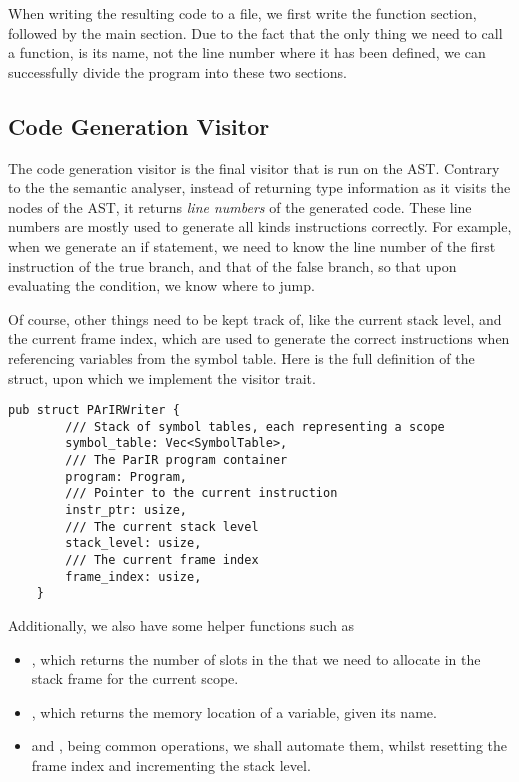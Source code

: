 When writing the resulting  code to a file, we first write the
function section, followed by the main section. Due to the fact that the only
thing we need to call a function, is its name, not the line number where it has
been defined, we can successfully divide the program into these two sections.

\newpage

\subsection{Code Generation Visitor}

The code generation visitor is the final visitor that is run on the AST.
Contrary to the the semantic analyser, instead of returning type information as
it visits the nodes of the AST, it returns \textit{line numbers} of the
generated  code. These line numbers are mostly used to generate all
kinds  instructions correctly. For example, when we generate an if
statement, we need to know the line number of the first instruction of the true
branch, and that of the false branch, so that upon evaluating the condition, we
know where to jump.

Of course, other things need to be kept track of, like the current stack level,
and the current frame index, which are used to generate the correct 
instructions when referencing variables from the symbol table. Here is the full
definition of the  struct, upon which we implement the visitor
trait.

\begin{mainbox}{}
    \lstset{xleftmargin=.1\textwidth, aboveskip=0pt, belowskip=0pt}
    \begin{lstlisting}
pub struct PArIRWriter {
        /// Stack of symbol tables, each representing a scope
        symbol_table: Vec<SymbolTable>,
        /// The ParIR program container
        program: Program,
        /// Pointer to the current instruction
        instr_ptr: usize,
        /// The current stack level
        stack_level: usize,
        /// The current frame index
        frame_index: usize,
    }
\end{lstlisting}
\end{mainbox}

Additionally, we also have some helper functions such as

\begin{itemize}
    \item {}, which returns the number of slots in
          the that we need to allocate in the stack frame for the current scope.
    \item {}, which returns the memory
          location of a variable, given its name.  \item {} and
          , being common operations, we shall automate them, whilst
          resetting the frame index and incrementing the stack level.
\end{itemize}
